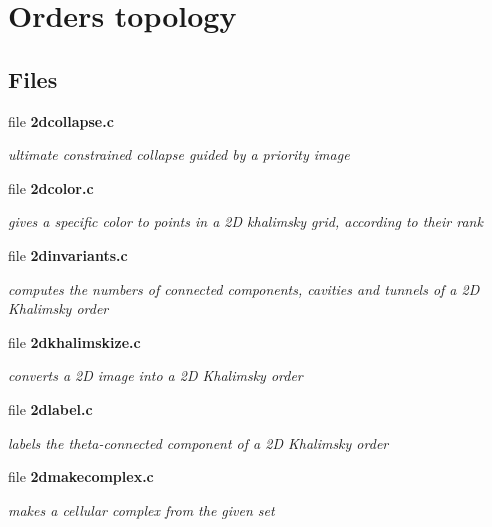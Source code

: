 \section{Orders topology}
\label{group__orders}
\subsection*{Files}
\begin{CompactItemize}
\item 
file {\bf 2dcollapse.c}
\begin{CompactList}\small\item\em ultimate constrained collapse guided by a priority image \item\end{CompactList}

\item 
file {\bf 2dcolor.c}
\begin{CompactList}\small\item\em gives a specific color to points in a 2D khalimsky grid, according to their rank \item\end{CompactList}

\item 
file {\bf 2dinvariants.c}
\begin{CompactList}\small\item\em computes the numbers of connected components, cavities and tunnels of a 2D Khalimsky order \item\end{CompactList}

\item 
file {\bf 2dkhalimskize.c}
\begin{CompactList}\small\item\em converts a 2D image into a 2D Khalimsky order \item\end{CompactList}

\item 
file {\bf 2dlabel.c}
\begin{CompactList}\small\item\em labels the theta-connected component of a 2D Khalimsky order \item\end{CompactList}

\item 
file {\bf 2dmakecomplex.c}
\begin{CompactList}\small\item\em makes a cellular complex from the given set \item\end{CompactList}


\end{CompactItemize}
